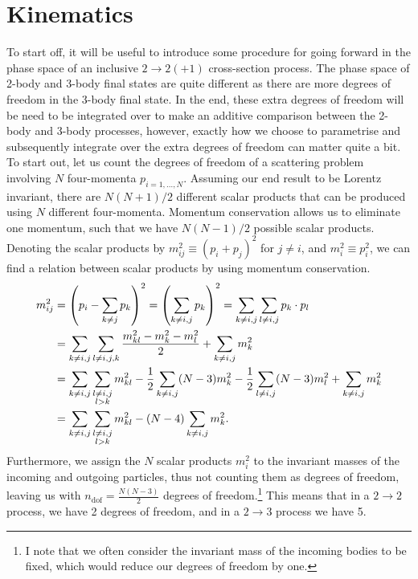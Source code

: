 \documentclass[../main.tex]{subfiles}
\begin{document}
\section{Kinematics}
To start off, it will be useful to introduce some procedure for going forward
in the phase space of an inclusive \(2\to 2(+1)\) cross-section process.
The phase space of 2-body and 3-body final states are quite different as there are
more degrees of freedom in the 3-body final state.
In the end, these extra degrees of freedom will be need to be integrated over to make an additive
comparison between the 2-body and 3-body processes, however, exactly how we
choose to parametrise and subsequently integrate over the extra degrees of
freedom can matter quite a bit.
\medskip
To start out, let us count the degrees
of freedom of a scattering problem involving \(N\) four-momenta
\(p_{i=1,\ldots,N}\).
Assuming our end result to be Lorentz invariant, there are \(N(N+1)/2\) different scalar products that can be produced using \(N\) different four-momenta.
Momentum conservation allows us to eliminate one momentum, such that we have \(N(N-1)/2\) possible scalar products.
Denoting the scalar products by \(m^2_{ij} \equiv (p_i + p_j)^2\) for \(j \neq i\), and \(m^2_i \equiv p_i^2\), we can find a relation between scalar products by using momentum conservation.
\begin{align} \nonumber
  m^2_{ij} & = \left(p_i - \sum_{k\neq j} p_k\right)^2 =
  \left(\sum_{k\neq i,j} p_k\right)^2 = \sum_{k\neq i,j} \sum_{l\neq i,j}
  p_k\cdot
  p_l
  \\
  \nonumber
           & = \sum_{k\neq i,j} \sum_{l\neq i,j,k} \frac{m^2_{kl} - m^2_k
  - m^2_l}{2} + \sum_{k\neq i,j} m^2_k
  \\
  \nonumber
           & = \sum_{k\neq i,j} \sum_{\substack{l\neq i,j
  \\l>k}} m^2_{kl}
  - \frac{1}{2} \sum_{k\neq i, j} (N-3) m^2_k - \frac{1}{2} \sum_{l\neq
    i,j}
  (N-3) m^2_l + \sum_{k\neq i,j} m^2_k
  \\
           & = \sum_{k\neq i,j} \sum_{\substack{l\neq i,j
  \\l>k}} m^2_{kl}
  - (N-4) \sum_{k\neq i, j} m^2_k.
\end{align}
Furthermore, we assign the \(N\) scalar products \(m^2_i\) to the invariant
masses of the incoming and outgoing particles, thus not counting them as
degrees of freedom, leaving us with
\(n_\text{dof} = \frac{N(N-3)}{2}\) degrees of freedom.\footnote{I note that we
  often consider the invariant mass of the incoming bodies to be fixed,
  which
  would reduce our degrees of freedom by one.}
This means that in a \(2\to 2\) process, we have 2 degrees of freedom, and in a
\(2\to 3\) process we have 5.
\end{document}
